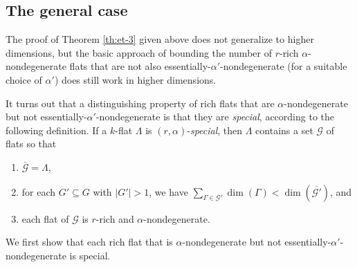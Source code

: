 \documentclass{article}
\begin{document}
\subsection{The general case}

The proof of Theorem \ref{th:et-3} given above does not generalize to higher dimensions, but the basic approach of bounding the number of $r$-rich $\alpha$-nondegenerate flats that are not also essentially-$\alpha'$-nondegenerate (for a suitable choice of $\alpha'$) does still work in higher dimensions.

It turns out that a distinguishing property of rich flats that are $\alpha$-nondegenerate but not essentially-$\alpha'$-nondegenerate is that they are \textit{special}, according to the following definition.
If a $k$-flat $\Lambda$ is $(r,\alpha)$-\textit{special}, then $\Lambda$ contains a set $\mathcal{G}$ of flats so that
\begin{enumerate}
	\item $\overline{\mathcal{G}} = \Lambda$,
	\item for each $G' \subseteq G$ with $|G'| > 1$, we have $\sum_{\Gamma \in \mathcal{G'}} \dim(\Gamma) < \dim(\overline{\mathcal{G'}})$, and
	\item each flat of $\mathcal{G}$ is $r$-rich and $\alpha$-nondegenerate.
\end{enumerate}

We first show that each rich flat that is $\alpha$-nondegenerate but not essentially-$\alpha'$-nondegenerate is special.
\end{document}
